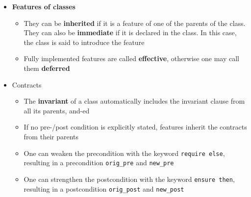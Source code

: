 \documentclass[a4paper]{article}
\newcommand{\inline}[1]{\lstinline!#1!}%
\begin{document}
\begin{itemize}
\begin{center}
\end{center}
\item \textbf{Features of classes}
\begin{itemize}
\item They can be \textbf{inherited} if it is a feature of one of the parents of the class. They can also be \textbf{immediate} if it is declared in the class. In this case, the class is said to introduce the feature
\item Fully implemented features are called \textbf{effective}, otherwise one may call them \textbf{deferred}
\end{itemize}
\item Contracts 
\begin{itemize}
\item The \textbf{invariant} of a class automatically includes the invariant clause from all its parents, and-ed
\item If no pre-/post condition is explicitly stated, features inherit the contracts from their parents
\item One can weaken the precondition with the keyword \inline{require else}, resulting in a precondition \inline{orig_pre} and \inline{new_pre}
\item One can strengthen the postcondition with the keyword \inline{ensure then}, resulting in a postcondition \inline{orig_post} and \inline{new_post}
\end{itemize}
\end{itemize}
\end{document}
